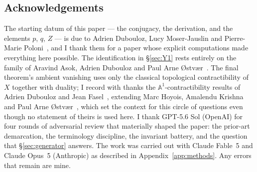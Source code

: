 \documentclass[11pt]{article}
\theoremstyle{definition}
\theoremstyle{remark}
\newcommand{\Aff}[1]{\mathbb{A}^{#1}}
\begin{document}
\subsection*{Acknowledgements}

The starting datum of this paper --- the conjugacy, the derivation, and the
elements $p$, $q$, $Z$ --- is due to Adrien Dubouloz, Lucy Moser-Jauslin and
Pierre-Marie Poloni~\cite{DMJP2009}, and I thank them for a paper whose
explicit computations made everything here possible. The identification in
\S\ref{sec:Y1} rests entirely on the family of Aravind Asok, Adrien Dubouloz
and Paul Arne {\O}stv{\ae}r~\cite{ADO2021}. The final theorem's ambient
vanishing uses only the classical topological contractibility of $X$ together
with duality; I record with thanks the $\Aff{1}$-contractibility results of
Adrien Dubouloz and Jean Fasel~\cite{DF2015}, extending Marc Hoyois, Amalendu
Krishna and Paul Arne {\O}stv{\ae}r~\cite{HKO2014}, which set the context for
this circle of questions even though no statement of theirs is used here.
I thank GPT-5.6 Sol (OpenAI) for four rounds of adversarial review that
materially shaped the paper: the prior-art demarcation, the terminology
discipline, the invariant battery, and the question that \S\ref{sec:generator}
answers. The work was carried out with Claude Fable~5 and Claude Opus~5
(Anthropic) as described in Appendix~\ref{app:methods}. Any errors that remain
are mine.
\end{document}
